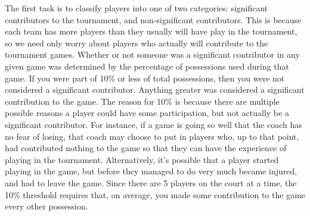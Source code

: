The first task is to classify players into one of two categories: significant contributors to the tournament, and non-significant contributors.  
This is because each team has more players than they usually will have play in the tournament, so we need only worry about players who actually will contribute to the tournament games.  
Whether or not someone was a significant contributor in any given game was determined by the percentage of possessions used during that game.  
If you were part of 10\% or less of total possessions, then you were not considered a significant contributor.  
Anything greater was considered a significant contribution to the game.  
The reason for 10\% is because there are multiple possible reasons a player could have some participation, but not actually be a significant contributor.  
For instance, if a game is going so well that the coach has no fear of losing, that coach may choose to put in players who, up to that point, had contributed nothing to the game so that they can have the experience of playing in the tournament.  
Alternatively, it's possible that a player started playing in the game, but before they managed to do very much became injured, and had to leave the game.  
Since there are 5 players on the court at a time, the 10\% threshold requires that, on average, you made some contribution to the game every other possession.  

